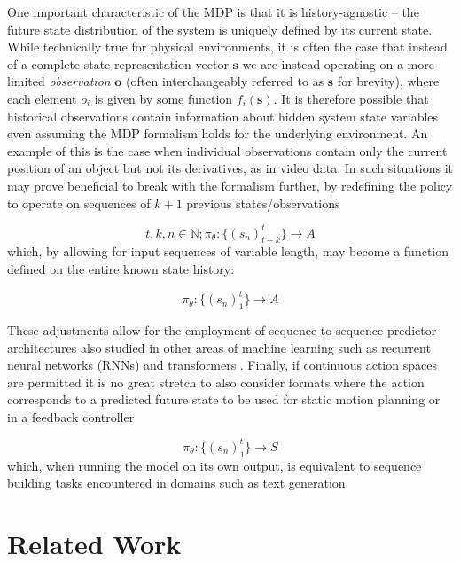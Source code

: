 \documentclass{article}
\begin{document}
One important characteristic of the MDP is that it is history-agnostic -- the future state distribution of the system is uniquely defined by its current state. While technically true for physical environments, it is often the case that instead of a complete state representation vector $\mathbf{s}$ we are instead operating on a more limited \emph{observation} $\mathbf{o}$ (often interchangeably referred to as $\mathbf{s}$ for brevity), where each element $o_i$ is given by some function $f_i(\mathbf{s})$. It is therefore possible that historical observations contain information about hidden system state variables even assuming the MDP formalism holds for the underlying environment. An example of this is the case when individual observations contain only the current position of an object but not its derivatives, as in video data. In such situations it may prove beneficial to break with the formalism further, by redefining the policy to operate on sequences of $k+1$ previous states/observations

\begin{equation}
	t, k, n \in \mathbb{N}; \pi_{\theta}:\lbrace {(s_n)_{t-k}^t} \rbrace \rightarrow A
\end{equation}
which, by allowing for input sequences of variable length, may become a function defined on the entire known state history:

\begin{equation}
	\pi_{\theta}:\lbrace {(s_n)_1^t} \rbrace \rightarrow A
\end{equation}

These adjustments allow for the employment of sequence-to-sequence predictor architectures also studied in other areas of machine learning such as recurrent neural networks (RNNs) \citep{rumelhart1985learning} and transformers \citep{vaswani2017attention}. Finally, if continuous action spaces are permitted it is no great stretch to also consider formats where the action corresponds to a predicted future state to be used for static motion planning or in a feedback controller

\begin{equation}
	\pi_{\theta}:\lbrace {(s_n)_1^t} \rbrace \rightarrow S
\end{equation}
which, when running the model on its own output, is equivalent to sequence building tasks encountered in domains such as text generation. 


\section{Related Work}
\label{sec:related}
\end{document}
